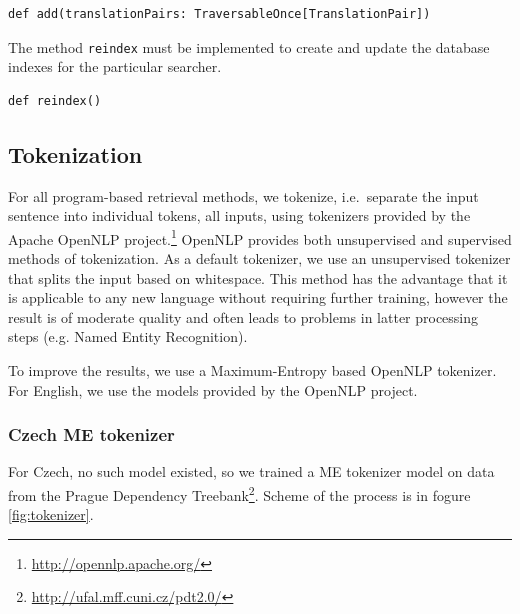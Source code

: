 \vspace*{0.5em}
 
\begin{lstlisting}
def add(translationPairs: TraversableOnce[TranslationPair])
\end{lstlisting}

\vspace*{0.5em}


The method {\tt reindex} must be implemented to create and update the database indexes for the particular searcher.

\begin{lstlisting}
def reindex()
\end{lstlisting}








\subsection{Tokenization}
\label{sec:tokenization}

For all program-based retrieval methods, we tokenize, i.e.\ separate the input sentence into individual tokens,
all inputs, using tokenizers provided by the Apache OpenNLP project.\footnote{\url{http://opennlp.apache.org/}}
OpenNLP provides both unsupervised and supervised methods of tokenization. 
As a default tokenizer, we use an unsupervised tokenizer that splits the input
based on whitespace. This method has the advantage that it is applicable to any new
language without requiring further training, however the result is of moderate
quality and often leads to problems in latter processing steps (e.g. Named Entity Recognition).

To improve the results, we use a Maximum-Entropy based OpenNLP tokenizer. For English, we use the
models provided by the OpenNLP project. 


\subsubsection*{Czech ME tokenizer}

For Czech, no such model existed, so we trained a ME tokenizer
model on data from the Prague Dependency Treebank\footnote{\url{http://ufal.mff.cuni.cz/pdt2.0/}}. Scheme of the process is in fogure \ref{fig:tokenizer}. 

